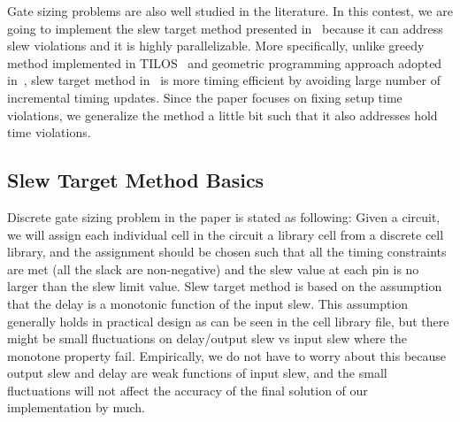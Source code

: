 Gate sizing problems are also well studied in the literature. In this contest, we are going to implement the slew target method presented in~\cite{Held:Gate} because it can address slew violations and it is highly parallelizable. More specifically, unlike greedy method implemented in TILOS~\cite{Fishburn:TILOS} and geometric programming approach adopted in~\cite{Sapatnekar:An}, slew target method in~\cite{Held:Gate} is more timing efficient by avoiding large number of incremental timing updates. Since the paper focuses on fixing setup time violations, we generalize the method a little bit such that it also addresses hold time violations.
\subsection{Slew Target Method Basics}
Discrete gate sizing problem in the paper is stated as following: Given a circuit, we will assign each individual cell in the circuit a library cell from a discrete cell library, and the assignment should be chosen such that all the timing constraints are met (all the slack are non-negative) and the slew value at each pin is no larger than the slew limit value. Slew target method is based on the assumption that the delay is a monotonic function of the input slew. This assumption generally holds in practical design as can be seen in the cell library file, but there might be small fluctuations on delay/output slew vs input slew where the monotone property fail. Empirically, we do not have to worry about this because output slew and delay are weak functions of input slew, and the small fluctuations will not affect the accuracy of the final solution of our implementation by much.


